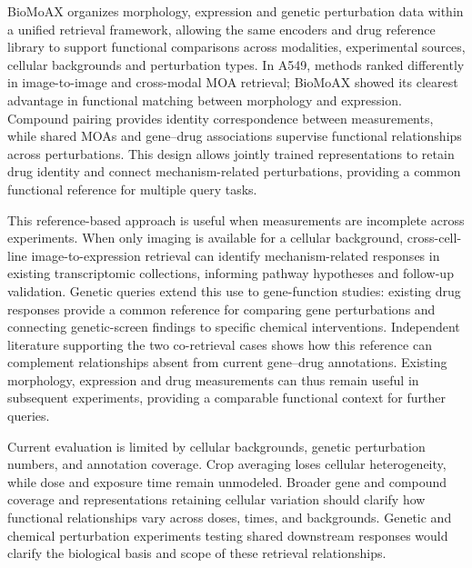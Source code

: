 BioMoAX organizes morphology, expression and genetic perturbation data within a unified retrieval framework, allowing the same encoders and drug reference library to support functional comparisons across modalities, experimental sources, cellular backgrounds and perturbation types. In A549, methods ranked differently in image-to-image and cross-modal MOA retrieval; BioMoAX showed its clearest advantage in functional matching between morphology and expression. Compound pairing provides identity correspondence between measurements, while shared MOAs and gene--drug associations supervise functional relationships across perturbations. This design allows jointly trained representations to retain drug identity and connect mechanism-related perturbations, providing a common functional reference for multiple query tasks.

This reference-based approach is useful when measurements are incomplete across experiments. When only imaging is available for a cellular background, cross-cell-line image-to-expression retrieval can identify mechanism-related responses in existing transcriptomic collections, informing pathway hypotheses and follow-up validation. Genetic queries extend this use to gene-function studies: existing drug responses provide a common reference for comparing gene perturbations and connecting genetic-screen findings to specific chemical interventions. Independent literature supporting the two co-retrieval cases shows how this reference can complement relationships absent from current gene--drug annotations. Existing morphology, expression and drug measurements can thus remain useful in subsequent experiments, providing a comparable functional context for further queries.

Current evaluation is limited by cellular backgrounds, genetic perturbation numbers, and annotation coverage. Crop averaging loses cellular heterogeneity, while dose and exposure time remain unmodeled. Broader gene and compound coverage and representations retaining cellular variation should clarify how functional relationships vary across doses, times, and backgrounds. Genetic and chemical perturbation experiments testing shared downstream responses would clarify the biological basis and scope of these retrieval relationships.
